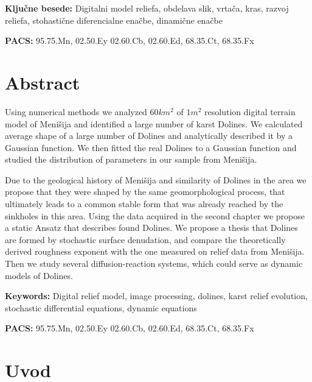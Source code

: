 \documentclass[a4paper, twoside, 12pt]{book}
\newcommand{\clearemptydoublepage}{\newpage{\pagestyle{empty}\cleardoublepage}}
\begin{document}
\vspace{1cm}

\noindent \textbf{Ključne besede:} Digitalni model reliefa, obdelava slik, vrtača, kras, razvoj reliefa, stohastične diferencialne enačbe, dinamične enačbe
\smallskip

\noindent \textbf{PACS:} 95.75.Mn, 02.50.Ey 02.60.Cb, 02.60.Ed, 68.35.Ct, 68.35.Fx
\clearemptydoublepage
{}

\chapter*{Abstract}

  Using numerical methods we analyzed $60 km^2$ of $1m^2$ resolution digital terrain model of Menišija and identified a large number of karst Dolines. We calculated average shape of a large number of Dolines and analytically described it by a Gaussian function. We then fitted the real Dolines to a Gaussian function and studied the distribution of parameters in our sample from Menišija.

  Due to the geological history of Menišija and similarity of Dolines in the area we propose that they were shaped by the same geomorphological process, that ultimately leads to a common stable form that was already reached by the sinkholes in this area.
  Using the data acquired in the second chapter we propose a static Ansatz that describes found Dolines. We propose a thesis that Dolines are formed by stochastic surface denudation, and compare the theoretically derived roughness exponent with the one measured on relief data from Menišija. Then we study several diffusion-reaction systems, which could serve as dynamic models of Dolines.

\vspace{1cm}

\noindent \textbf{Keywords:} Digital relief model, image processing, dolines, karst relief evolution, stochastic differential equations, dynamic equations
\smallskip

\noindent \textbf{PACS:} 95.75.Mn, 02.50.Ey 02.60.Cb, 02.60.Ed, 68.35.Ct, 68.35.Fx
\clearemptydoublepage

\pagestyle{fancy}
\rhead{\thepage}

\tableofcontents{}
\clearemptydoublepage

\chapter{Uvod}
\label{ch:uvod}
\end{document}
